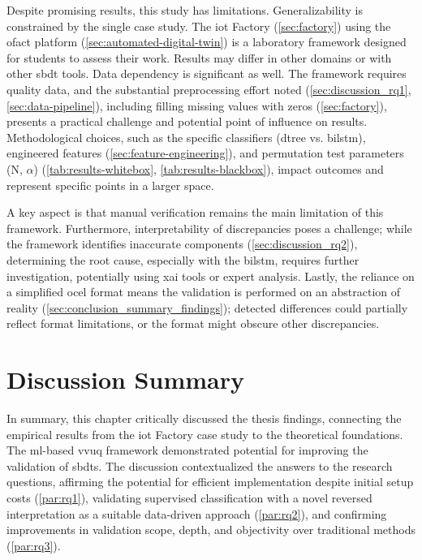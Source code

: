 Despite promising results, this study has limitations. Generalizability is constrained by the single case study. The \gls{iot} Factory (\autoref{sec:factory}) using the \gls{ofact} platform (\autoref{sec:automated-digital-twin}) is a laboratory framework designed for students to assess their work. Results may differ in other domains or with other \gls{sbdt} tools. Data dependency is significant as well. The framework requires quality data, and the substantial preprocessing effort noted (\autoref{sec:discussion_rq1}, \autoref{sec:data-pipeline}), including filling missing values with zeros (\autoref{sec:factory}), presents a practical challenge and potential point of influence on results. Methodological choices, such as the specific classifiers (\gls{dtree} vs. \gls{bilstm}), engineered features (\autoref{sec:feature-engineering}), and permutation test parameters (N, $\alpha$) (\autoref{tab:results-whitebox}, \autoref{tab:results-blackbox}), impact outcomes and represent specific points in a larger space.

A key aspect is that manual verification remains the main limitation of this framework. Furthermore, interpretability of discrepancies poses a challenge; while the framework identifies inaccurate components (\autoref{sec:discussion_rq2}), determining the root cause, especially with the \gls{bilstm}, requires further investigation, potentially using \gls{xai} tools or expert analysis. Lastly, the reliance on a simplified \gls{ocel} format means the validation is performed on an abstraction of reality (\autoref{sec:conclusion_summary_findings}); detected differences could partially reflect format limitations, or the format might obscure other discrepancies.

\section{Discussion Summary}
\label{sec:discussion_summary}
In summary, this chapter critically discussed the thesis findings, connecting the empirical results from the \gls{iot} Factory case study to the theoretical foundations. The \gls{ml}-based \gls{vvuq} framework demonstrated potential for improving the validation of \gls{sbdt}s. The discussion contextualized the answers to the research questions, affirming the potential for efficient implementation despite initial setup costs (\autoref{par:rq1}), validating supervised classification with a novel reversed interpretation as a suitable data-driven approach (\autoref{par:rq2}), and confirming improvements in validation scope, depth, and objectivity over traditional methods (\autoref{par:rq3}).